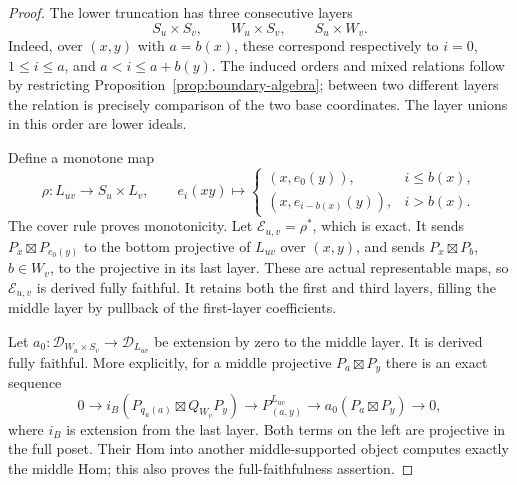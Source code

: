 \documentclass[11pt]{article}
\theoremstyle{definition}
\begin{document}
\begin{proof}
The lower truncation has three consecutive layers
\[
 S_u\times S_v,\qquad W_u\times S_v,\qquad S_u\times W_v.
\]
Indeed, over $(x,y)$ with $a=b(x)$, these correspond respectively
to $i=0$, $1\leq i\leq a$, and $a<i\leq a+b(y)$.
The induced orders and mixed relations follow by restricting
Proposition~\ref{prop:boundary-algebra}; between two different
layers the relation is precisely comparison of the two base
coordinates. The layer unions in this order are lower ideals.

Define a monotone map
\[
 \rho:L_{uv}\longrightarrow S_u\times L_v,
 \qquad
 e_i(xy)\longmapsto
 \begin{cases}
 (x,e_0(y)),&i\leq b(x),\\
 (x,e_{i-b(x)}(y)),&i>b(x).
 \end{cases}
\]
The cover rule proves monotonicity. Let
$\mathcal E_{u,v}=\rho^*$, which is exact.
It sends $P_x\boxtimes P_{e_0(y)}$ to the bottom projective of
$L_{uv}$ over $(x,y)$, and sends $P_x\boxtimes P_b$, $b\in W_v$,
to the projective in its last layer. These are actual representable
maps, so $\mathcal E_{u,v}$ is derived fully faithful. It retains
both the first and third layers, filling the middle layer by
pullback of the first-layer coefficients.

Let $a_0:\mathcal D_{W_u\times S_v}\to\mathcal D_{L_{uv}}$
be extension by zero to the middle layer. It is derived fully
faithful. More explicitly, for a middle projective
$P_a\boxtimes P_y$ there is an exact sequence
\begin{equation}\label{eq:middle-resolution}
 0\longrightarrow i_B(P_{q_u(a)}\boxtimes Q_{W_v}P_y)
 \longrightarrow P^{L_{uv}}_{(a,y)}
 \longrightarrow a_0(P_a\boxtimes P_y)\longrightarrow0,
\end{equation}
where $i_B$ is extension from the last layer. Both terms on the
left are projective in the full poset. Their Hom into another
middle-supported object computes exactly the middle Hom; this
also proves the full-faithfulness assertion.


\end{proof}
\end{document}
